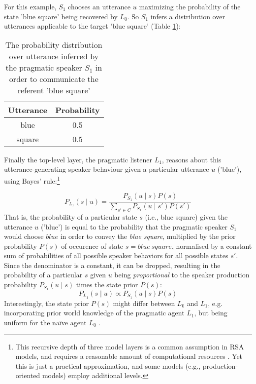 For this example, $S_1$ chooses an utterance $u$ maximizing the probability of the state 'blue square' being recovered by $L_0$. So $S_1$ infers a distribution over utterances applicable to the target 'blue square' (Table \ref{rsa-s1}):

\begin{table}[h]
	\begin{center}
		\caption{The probability distribution over utterance inferred by the pragmatic speaker $S_1$ in order to communicate the referent 'blue square'}
		\label{rsa-s1}
		\vskip 0.12in
		\begin{tabular}{cc}
			Utterance & Probability \\
			\hline
			blue & 0.5 \\
			square & 0.5
		\end{tabular}
	\end{center}
\end{table}
 
Finally the top-level layer, the pragmatic listener $L_1$, reasons about this utterance-generating speaker behaviour given a particular utterance $u$ ('blue'), using Bayes' rule:\footnote{This recursive depth of three model layers is a common assumption in RSA models, and requires a reasonable amount of computational resources \parencite{lassiter2017adjectival}. Yet this is just a practical approximation, and some models (e.g., production-oriented models) employ additional levels\parencite{problang}.}
 
$$P_{L_1}(s \mid u) = \frac{P_{S_1}(u \mid s) P(s)}{\sum_{s' \in C} P_{S_1}(u \mid s') P(s')}$$
That is, the probability of a particular state $s$ (i.e., blue square) given the utterance $u$ ('blue') is equal to the probability that the pragmatic speaker $S_1$ would choose $blue$ in order to convey the \textit{blue square}, multiplied by the prior probability $P(s)$ of occurence of state $s = blue \:square$, normalised by a constant sum of probabilities of all possible speaker behaviors for all possible states $s'$. Since the denominator is a constant, it can be dropped, resulting in the probability of a particular $s$ given $u$ being \emph{proportional} to the speaker production probability $P_{S_1}(u \mid s)$ times the state prior $P(s)$:
$$P_{L_1}(s \mid u) \propto P_{S_1}(u \mid s) P(s)$$ 
Interestingly, the state prior $P(s)$ might differ between $L_0$ and $L_1$, e.g. incorporating prior world knowledge of the pragmatic agent $L_1$, but being uniform for the na\"ive agent $L_0$ \parencite{problang}. 

